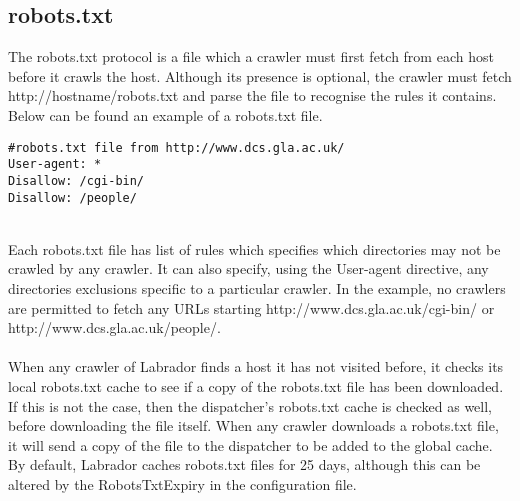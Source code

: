 \subsection{robots.txt}
The robots.txt\cite{site4} protocol is a file which a crawler must first fetch from each host before it crawls the host. Although its presence is optional, the crawler must fetch http://hostname/robots.txt and parse the file to recognise the rules it contains. Below can be found an example of a robots.txt file.
\renewcommand{\baselinestretch}{1.0}
\begin{verbatim}
#robots.txt file from http://www.dcs.gla.ac.uk/
User-agent: *
Disallow: /cgi-bin/
Disallow: /people/
\end{verbatim}\\
\renewcommand{\baselinestretch}{1.5}
Each robots.txt file has list of rules which specifies which directories may not be crawled by any crawler. It can also specify, using the User-agent directive, any directories exclusions specific to a particular crawler. In the example, no crawlers are permitted to fetch any URLs starting http://www.dcs.gla.ac.uk/cgi-bin/ or http://www.dcs.gla.ac.uk/people/.\\
\ \\
When any crawler of Labrador finds a host it has not visited before, it checks its local robots.txt cache to see if a copy of the robots.txt file has been downloaded. If this is not the case, then the dispatcher's robots.txt cache is checked as well, before downloading the file itself. When any crawler downloads a robots.txt file, it will send a copy of the file to the dispatcher to be added to the global cache. By default, Labrador caches robots.txt files for 25 days, although this can be altered by the RobotsTxtExpiry in the configuration file.
